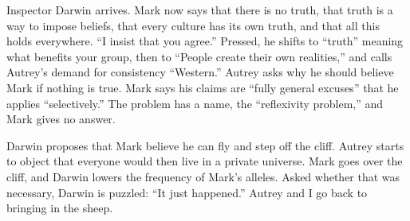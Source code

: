 Inspector Darwin arrives. Mark now says that there is no truth, that truth is a way to impose beliefs, that every culture has its own truth, and that all this holds everywhere. ``I insist that you agree.'' Pressed, he shifts to ``truth'' meaning what benefits your group, then to ``People create their own realities,'' and calls Autrey's demand for consistency ``Western.'' Autrey asks why he should believe Mark if nothing is true. Mark says his claims are ``fully general excuses'' that he applies ``selectively.'' The problem has a name, the ``reflexivity problem,'' and Mark gives no answer. 

Darwin proposes that Mark believe he can fly and step off the cliff. Autrey starts to object that everyone would then live in a private universe. Mark goes over the cliff, and Darwin lowers the frequency of Mark's alleles. Asked whether that was necessary, Darwin is puzzled: ``It just happened.'' Autrey and I go back to bringing in the sheep.
